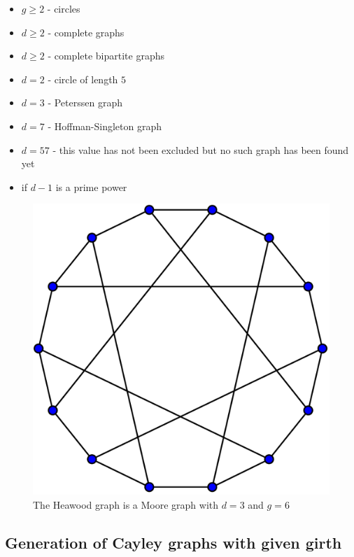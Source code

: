 \documentclass[a4paper,12pt,oneside]{report}%
\begin{document}
\begin{itemize}
	\item{$g \geq 2$ - circles}
	\item{$d \geq 2$ - complete graphs}
	\item{$d \geq 2$ - complete bipartite graphs}
	\item{$d=2$ - circle of length $5$}
	\item[]{\makebox[2cm]{\hfill}$d=3$ - Peterssen graph}
	\item[]{\makebox[2cm]{\hfill}$d=7$ - Hoffman-Singleton graph}
	\item[]{\makebox[2cm]{\hfill}$d=57$ - this value has not been excluded but no such graph has been found yet }
	\item{if $d-1$ is a prime power}
\end{itemize}

\begin{figure}[!ht]
	\centering
	\includegraphics[scale=0.15]{Heawood_graph.png}
	\caption{The Heawood graph is a Moore graph with $d=3$ and $g=6$ }
\end{figure}

\subsection{Generation of Cayley graphs with given girth}
\end{document}
